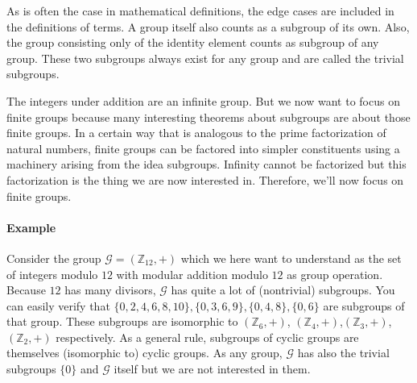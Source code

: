 \medskip
As is often the case in mathematical definitions, the edge cases are included in the definitions of terms. A group itself also counts as a subgroup of its own. Also, the group consisting only of the identity element counts as subgroup of any group. These two subgroups always exist for any group and are called the trivial subgroups.

\medskip
The integers under addition are an infinite group. But we now want to focus on finite groups because many interesting theorems about subgroups are about those finite groups. In a certain way that is analogous to the prime factorization of natural numbers, finite groups can be factored into simpler constituents using a machinery arising from the idea subgroups. Infinity cannot be factorized but this factorization is the thing we are now interested in. Therefore, we'll now focus on finite groups.

\paragraph{Example}
Consider the group $\mathcal{G} = (\mathbb{Z}_{12}, +)$ which we here want to understand as the set of integers modulo $12$ with modular addition modulo $12$ as group operation. Because $12$ has many divisors, $\mathcal{G}$ has quite a lot of (nontrivial) subgroups. You can easily verify that $\{0,2,4,6,8,10\}, \{0,3,6,9\}, \{0,4,8\}, \{0,6\}$ are subgroups of that group. These subgroups are isomorphic to $(\mathbb{Z}_{6}, +)$, $(\mathbb{Z}_{4}, +)$,$(\mathbb{Z}_{3}, +)$, $(\mathbb{Z}_{2}, +)$ respectively. As a general rule, subgroups of cyclic groups are themselves (isomorphic to) cyclic groups. As any group, $\mathcal{G}$ has also the trivial subgroups $\{ 0 \}$ and $\mathcal{G}$ itself but we are not interested in them. 





